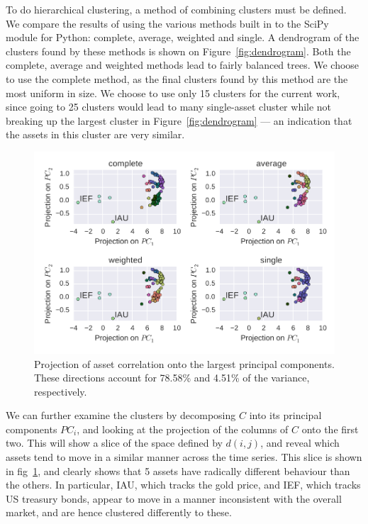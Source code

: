 To do hierarchical clustering, a method of combining clusters must be defined.
We compare the results of using the various methods built in to the SciPy module for Python: complete, average, weighted and single.
A dendrogram of the clusters found by these methods is shown on Figure~\ref{fig:dendrogram}.
Both the complete, average and weighted methods lead to fairly balanced trees.
We choose to use the complete method, as the final clusters found by this method are the most uniform in size.
We choose to use only 15 clusters for the current work, since going to 25 clusters would lead to many single-asset cluster while not breaking up the largest cluster in Figure~\ref{fig:dendrogram} --- an indication that the assets in this cluster are very similar.

\begin{figure}[tp]
\centering
\includegraphics[width=1.0\textwidth]{../pic/pca_methods.pdf}
\caption{Projection of asset correlation onto the largest principal components. These directions account for 78.58\% and 4.51\% of the variance, respectively.}
\label{fig:pca}
\end{figure}

We can further examine the clusters by decomposing $C$ into its principal components $PC_i$, and looking at the projection of the columns of $C$ onto the first two.
This will show a slice of the space defined by $d(i,j)$, and reveal which assets tend to move in a similar manner across the time series.
This slice is shown in fig~\ref{fig:pca}, and clearly shows that 5 assets have radically different behaviour than the others.
In particular, IAU, which tracks the gold price, and IEF, which tracks US treasury bonds, appear to move in a manner inconsistent with the overall market, and are hence clustered differently to these.

